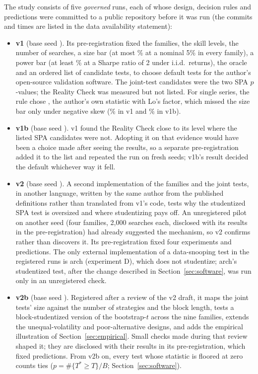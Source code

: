 The study consists of five \emph{governed} runs, each of whose design, decision rules and predictions were committed to a public repository before it was run (the commits and times are listed in the data availability statement):
\begin{itemize}
  \item \textbf{v1} (base seed ). Its pre-registration fixed the families, the skill levels, the number of searches, a size bar (at most \% at a nominal 5\% in every family), a power bar (at least \% at a Sharpe ratio of 2 under i.i.d.\ returns), the oracle and an ordered list of candidate tests, to choose default tests for the author's open-source validation software. The joint-test candidates were the two SPA $p$-values; the Reality Check was measured but not listed. For single series, the rule chose , the author's own statistic with Lo's factor, which missed the size bar only under negative skew (\% in v1 and \% in v1b).
  \item \textbf{v1b} (base seed ). v1 found the Reality Check close to its level where the listed SPA candidates were not. Adopting it on that evidence would have been a choice made after seeing the results, so a separate pre-registration added it to the list and repeated the run on fresh seeds; v1b's result decided the default whichever way it fell.
  \item \textbf{v2} (base seed ). A second implementation of the families and the joint tests, in another language, written by the same author from the published definitions rather than translated from v1's code, tests why the studentized SPA test is oversized and where studentizing pays off. An unregistered pilot on another seed (four families, 2,000 searches each, disclosed with its results in the pre-registration) had already suggested the mechanism, so v2 confirms rather than discovers it. Its pre-registration fixed four experiments and  predictions. The only external implementation of a data-snooping test in the registered runs is arch  (experiment D), which does not studentize; arch's studentized test, after the change described in Section~\ref{sec:software}, was run only in an unregistered check.
  \item \textbf{v2b} (base seed ). Registered after a review of the v2 draft, it maps the joint tests' size against the number of strategies and the block length, tests a block-studentized version of the bootstrap-$t$ across the nine families, extends the unequal-volatility and poor-alternative designs, and adds the empirical illustration of Section~\ref{sec:empirical}. Small checks made during that review shaped it; they are disclosed with their results in its pre-registration, which fixed  predictions. From v2b on, every test whose statistic is floored at zero counts ties ($p=\#\{T^*\ge T\}/B$; Section~\ref{sec:software}).

\end{itemize}
